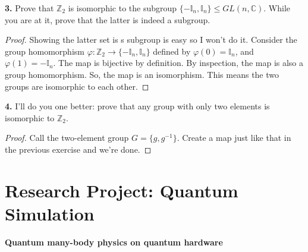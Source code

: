 \documentclass{book}
\theoremstyle{definition}
\begin{document}
\noindent \textbf{3.} Prove that $\mathbb{Z}_2$ is isomorphic to the subgroup $\{-\mathbb{I}_n, \mathbb{I}_n \} \leq GL(n,\mathbb{C})$. While you are at it, prove that the latter is indeed a subgroup.

\begin{proof}
	Showing the latter set is s subgroup is easy so I won't do it. Consider the group homomorphism $\varphi: \mathbb{Z}_2 \to \{ -\mathbb{I}_n, \mathbb{I}_n \}$ defined by $\varphi(0) = \mathbb{I}_n$, and $\varphi(1) = -\mathbb{I}_n$. The map is bijective by definition. By inspection, the map is also a group homomorphism. So, the map is an isomorphism. This means the two groups are isomorphic to each other. 
\end{proof}


\noindent \textbf{4.} I'll do you one better: prove that any group with only two elements is isomorphic to $\mathbb{Z}_2$.

\begin{proof}
	Call the two-element group $G = \{ g,g^{-1} \}$. Create a map just like that in the previous exercise and we're done. 
\end{proof}















































\newpage



\chapter{Research Project: Quantum Simulation}

\textbf{Quantum many-body physics on quantum hardware}\\
\end{document}

